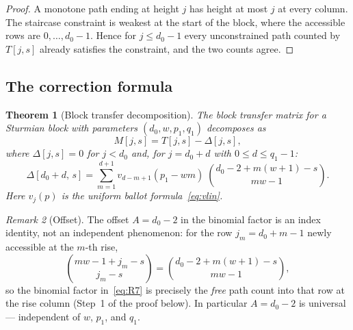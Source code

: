 \documentclass[11pt]{article}
\newtheorem{theorem}{Theorem}[section]
\theoremstyle{definition}
\theoremstyle{remark}
\newtheorem{remark}[theorem]{Remark}
\begin{document}
\begin{proof}
A monotone path ending at height $j$ has height at most $j$ at
every column.
The staircase constraint is weakest at the start of the block,
where the accessible rows are $0, \ldots, d_0 - 1$.
Hence for $j \leq d_0 - 1$ every unconstrained path counted by
$T[j, s]$ already satisfies the constraint, and the two counts
agree.
\end{proof}

\subsection{The correction formula}

\begin{theorem}[Block transfer decomposition]\label{thm:transfer}
The block transfer matrix for a Sturmian block with parameters
$(d_0, w, p_1, q_1)$ decomposes as
\begin{equation}\label{eq:decomp}
  M[j, s] = T[j, s] - \Delta[j, s],
\end{equation}
where $\Delta[j, s] = 0$ for $j < d_0$ and, for
$j = d_0 + d$ with $0 \leq d \leq q_1 - 1$:
\begin{equation}\label{eq:R7}
  \Delta[d_0{+}d,\, s] = \sum_{m=1}^{d+1}
    v_{d-m+1}(p_1 - wm)\;\binom{d_0 - 2 + m(w{+}1) - s}{mw - 1}.
\end{equation}
Here $v_j(p)$ is the uniform ballot formula~\eqref{eq:vlin}.
\end{theorem}

\begin{remark}[Offset]\label{rmk:offset}
The offset $A = d_0 - 2$ in the binomial factor is an index
identity, not an independent phenomenon: for the row
$j_m = d_0 + m - 1$ newly accessible at the $m$-th rise,
\[
  \binom{mw - 1 + j_m - s}{j_m - s}
  = \binom{d_0 - 2 + m(w{+}1) - s}{mw - 1},
\]
so the binomial factor in~\eqref{eq:R7} is precisely the
\emph{free} path count into that row at the rise column
(Step~1 of the proof below).
In particular $A = d_0 - 2$ is universal --- independent of $w$,
$p_1$, and $q_1$.
\end{remark}
\end{document}
